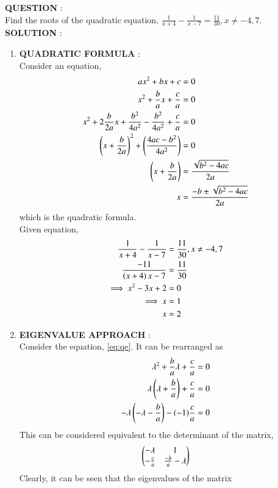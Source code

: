 \documentclass[journal]{IEEEtran}
\begin{document}
\textbf{QUESTION} : \\
Find the roots of the quadratic equation, $\frac{1}{x+4} - \frac{1}{x-7} = \frac{11}{30}, x \neq -4, 7$. \\
\textbf{SOLUTION} : \\
\begin{enumerate}
	\item \textbf{QUADRATIC FORMULA} : \\
	Consider an equation, 
	\begin{align}
		ax^2 + bx + c &= 0 \\
	        x^2 + \frac{b}{a} x + \frac{c}{a} &= 0 \label{eq:qe} \\
		x^2 + 2 \frac{b}{2a} x + \frac{b^2}{4a^2} - \frac{b^2}{4a^2} + \frac{c}{a} &= 0 \\
		\left(x + \frac{b}{2a}\right)^2 + \left(\frac{4ac - b^2}{4a^2}\right) &= 0 \\
		\left(x + \frac{b}{2a}\right) &= \frac{\sqrt{b^2 - 4ac}}{2a} \\
		x &= \frac{-b \pm \sqrt{b^2 - 4ac}}{2a}
	\end{align}
	which is the quadratic formula. \\
Given equation, 
\begin{align}
	\frac{1}{x+4} - \frac{1}{x-7} &= \frac{11}{30}, x \neq -4, 7 \\
	\frac{-11}{\left(x+4\right){x-7}} &= \frac{11}{30} \\
	\implies x^2 - 3x + 2 &= 0 \\
	\implies x &= 1 \\
	x &= 2
\end{align}
	\item \textbf{EIGENVALUE APPROACH} : \\
	Consider the equation, \eqref{eq:qe}. It can be rearranged as
	\begin{align}
		\lambda ^2 + \frac{b}{a} \lambda + \frac{c}{a} &= 0 \\
		\lambda \left(\lambda + \frac{b}{a}\right) + \frac{c}{a} &= 0 \\
		-\lambda \left(-\lambda - \frac{b}{a}\right) - (-1) \frac{c}{a} &= 0
	\end{align}
	This can be considered equivalent to the determinant of the matrix, 
	\begin{align}
		\begin{pmatrix}-\lambda & 1 \\ -\frac{c}{a} & \frac{-b}{a} - \lambda\end{pmatrix} \label{eq:matrix}
	\end{align}
	Clearly, it can be seen that the eigenvalues of the matrix 
	\begin{align}

\end{align}
\end{enumerate}
\end{document}

